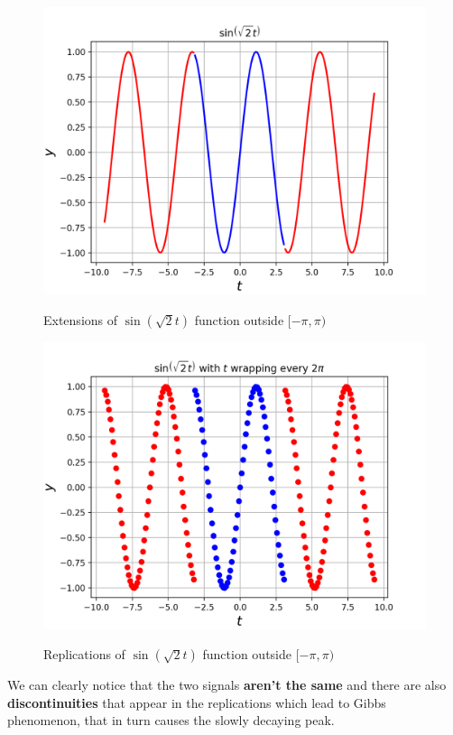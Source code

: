 \documentclass[11pt, a4paper]{article}
\begin{document}
\begin{figure}[H]
   	\centering
   	\includegraphics[scale=0.5]{ex_1_ext.png}
   	\label{fig:ex_1_ext}
   	\caption{Extensions of $\sin(\sqrt{2} t)$ function outside $[-\pi,\pi)$}
\end{figure}
\begin{figure}[H]
   	\centering
   	\includegraphics[scale=0.5]{ex_1_rep.png}
   	\label{fig:ex_1_rep}
   	\caption{Replications of $\sin(\sqrt{2} t)$ function outside $[-\pi,\pi)$}
\end{figure}
{
We can clearly notice that the two signals \textbf{aren't the same} and there are also \textbf{discontinuities} that appear in the replications which lead to Gibbs phenomenon, that in turn causes the slowly decaying peak.
}
\end{document}
